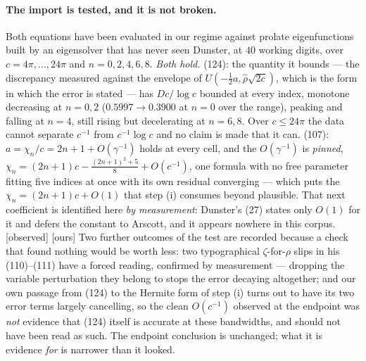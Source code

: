 \documentclass[11pt,a4paper]{article}
\theoremstyle{plain}
\theoremstyle{definition}
\theoremstyle{remark}
\newcommand{\st}[1]{{\normalfont\sffamily\footnotesize[#1]}}
\newcommand{\observed}{\st{observed}}
\newcommand{\ours}{{\normalfont\sffamily\footnotesize[ours]}}
\begin{document}
\paragraph{The import is tested, and it is not broken.}  Both equations have
been evaluated in our regime against prolate eigenfunctions built by an
eigensolver that has never seen Dunster, at $40$ working digits, over
$c=4\pi,\dots,24\pi$ and $n=0,2,4,6,8$.  \emph{Both hold.}  (124): the quantity
it bounds --- the discrepancy measured against the envelope of
$U(-\tfrac12a,\hat\rho\sqrt{2c})$, which is the form in which the error is
stated --- has $Dc/\log c$ bounded at every index, monotone decreasing at
$n=0,2$ ($0.5997\to0.3900$ at $n=0$ over the range), peaking and falling at
$n=4$, still rising but decelerating at $n=6,8$.  Over $c\le24\pi$ the data
cannot separate $c^{-1}$ from $c^{-1}\log c$ and no claim is made that it can.
(107): $a=\chi_n/c=2n+1+O(\gamma^{-1})$ holds at every cell, and the
$O(\gamma^{-1})$ is \emph{pinned},
$\chi_n=(2n+1)c-\frac{(2n+1)^2+5}{8}+O(c^{-1})$, one formula with no free
parameter fitting five indices at once with its own residual converging ---
which puts the $\chi_n=(2n+1)c+O(1)$ that step (i) consumes beyond plausible.
That next coefficient is identified here \emph{by measurement}: Dunster's (27)
states only $O(1)$ for it and defers the constant to Arscott, and it appears
nowhere in this corpus.  \observed{} \ours{}  Two further outcomes of the test
are recorded because a check that found nothing would be worth less: two
typographical $\zeta$-for-$\rho$ slips in his (110)--(111) have a forced
reading, confirmed by measurement --- dropping the variable perturbation they
belong to stops the error decaying altogether; and our own passage from (124)
to the Hermite form of step (i) turns out to have its two error terms largely
cancelling, so the clean $O(c^{-1})$ observed at the endpoint was \emph{not}
evidence that (124) itself is accurate at these bandwidths, and should not have
been read as such.  The endpoint conclusion is unchanged; what it is evidence
\emph{for} is narrower than it looked.
\end{document}

